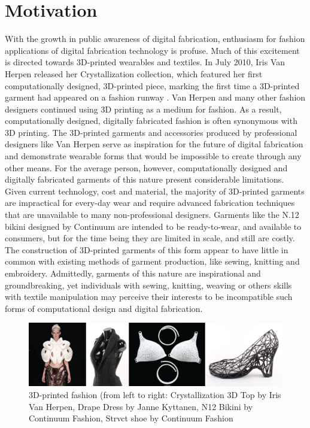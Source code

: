 \section{Motivation}
With the growth in public awareness of digital fabrication, enthusiasm for fashion applications of digital fabrication technology is profuse. Much of this excitement is directed towards 3D-printed wearables and textiles. In July 2010, Iris Van Herpen released her Crystallization collection, which featured her first computationally designed, 3D-printed piece, marking the first time a 3D-printed garment had appeared on a fashion runway \cite{herpen}. Van Herpen and many other fashion designers continued using 3D printing as a medium for fashion. As a result, computationally designed, digitally fabricated fashion is often synonymous with 3D printing. The 3D-printed garments and accessories produced by professional designers like Van Herpen serve as inspiration for the future of digital fabrication and demonstrate wearable forms that would be impossible to create through any other means. For the average person, however, computationally designed and digitally fabricated garments of this nature present considerable limitations. Given current technology, cost and material, the majority of 3D-printed garments are impractical for every-day wear and require advanced fabrication techniques that are unavailable to many non-professional designers. Garments like the N.12 bikini designed by Continuum \cite{n12} are intended to be ready-to-wear, and available to consumers, but for the time being they are limited in scale, and still are costly. The construction of 3D-printed garments of this form appear to have little in common with existing methods of garment production, like sewing, knitting and embroidery. Admittedly, garments of this nature are inspirational and groundbreaking, yet individuals with sewing, knitting, weaving or others skills with textile manipulation may perceive their interests to be incompatible such forms of computational design and digital fabrication.

\begin{center}
\begin{figure}[h!]
\includegraphics[width=6.5in]{images/3D_prinited_high_fashion.png}
\caption{ 3D-printed fashion (from left to right: Crystallization 3D Top by Iris Van Herpen, Drape Dress by Janne Kyttanen, N12 Bikini by Continuum Fashion, Strvct shoe by Continuum Fashion}
\label{fig:high_fashion}
\end{figure}
\end{center}

